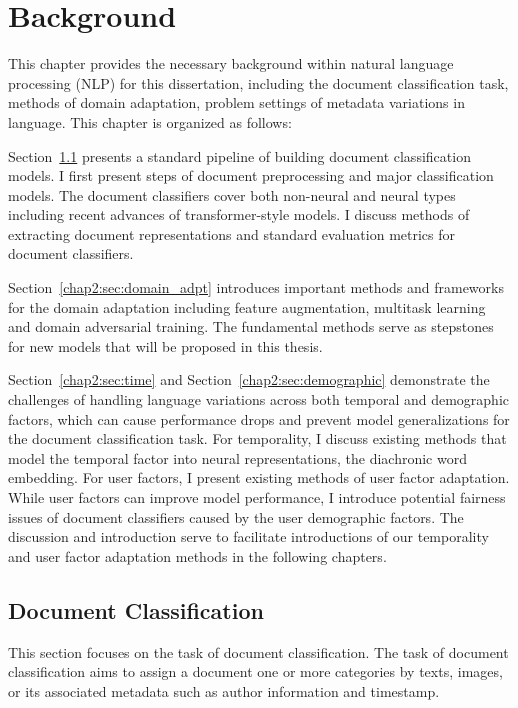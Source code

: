 \chapter{Background}
\label{chp:background}

This chapter provides the necessary background within natural language processing (NLP) for this dissertation, including the document classification task, methods of domain adaptation, problem settings of metadata variations in language.
This chapter is organized as follows:

Section~\ref{chap2:sec:doc_clf} presents a standard pipeline of building document classification models.
I first present steps of document preprocessing and major classification models. 
The document classifiers cover both non-neural and neural types including recent advances of transformer-style models. 
I discuss methods of extracting document representations and standard evaluation metrics for document classifiers. 

Section~\ref{chap2:sec:domain_adpt} introduces important methods and frameworks for the domain adaptation including feature augmentation, multitask learning and domain adversarial training. 
The fundamental methods serve as stepstones for new models that will be proposed in this thesis.

Section~\ref{chap2:sec:time} and Section~\ref{chap2:sec:demographic} demonstrate the challenges of handling language variations across both temporal and demographic factors, which can cause performance drops and prevent model generalizations for the document classification task.
For temporality, I discuss existing methods that model the temporal factor into neural representations, the diachronic word embedding. 
For user factors, I present existing methods of user factor adaptation. 
While user factors can improve model performance, I introduce potential fairness issues of document classifiers caused by the user demographic factors.
The discussion and introduction serve to facilitate introductions of our temporality and user factor adaptation methods in the following chapters.


\section{Document Classification}
\label{chap2:sec:doc_clf}
This section focuses on the task of document classification.
The task of document classification aims to assign a document one or more categories by texts, images, or its associated metadata such as author information and timestamp.


